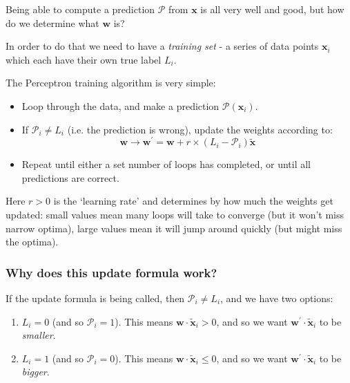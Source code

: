 \documentclass[a4paper,openany,11pt]{book}
\renewcommand\vec[1]{\boldsymbol{\mathbf{#1}}}
\begin{document}
						Being able to compute a prediction $\mathcal{P}$ from $\vec{x}$ is all very well and good, but how do we determine what $\vec{w}$ is?

						In order to do that we need to have a \textit{training set} - a series of data points $\vec{x}_i$ which each have their own true label $L_i$.

						The Perceptron training algorithm is very simple:
						\begin{itemize}
							\item Loop through the data, and make a prediction $\mathcal{P}(\vec{x}_i)$.
							\item If $\mathcal{P}_i \neq L_i$ (i.e. the prediction is wrong), update the weights according to:
							$$ \vec{w} \to \vec{w}^\prime  = \vec{w} + r \times(L_i - \mathcal{P}_i ) \tilde{\vec{x}}$$
							\item Repeat until either a set number of loops has completed, or until all predictions are correct.
						\end{itemize}

						Here $r > 0$ is the `learning rate' and determines by how much the weights get updated: small values mean many loops will take to converge (but it won't miss narrow optima), large values mean it will jump around quickly (but might miss the optima).

						\subsubsection{Why does this update formula work?}
						
							If the update formula is being called, then $\mathcal{P}_i \neq L_i$, and we have two options:
							\begin{enumerate}
								\item $L_i = 0$ (and so $\mathcal{P}_i = 1$). This means $\vec{w} \cdot \tilde{\vec{x}}_i > 0$, and so we want $\vec{w}^\prime \cdot \tilde{\vec{x}}_i$ to be \textit{smaller}.
								\item $L_i = 1$ (and so $\mathcal{P}_i = 0$). This means $\vec{w} \cdot \tilde{\vec{x}}_i \leq 0$, and so we want $\vec{w}^\prime \cdot \tilde{\vec{x}}_i$ to be \textit{bigger}.
							\end{enumerate}
\end{document}
